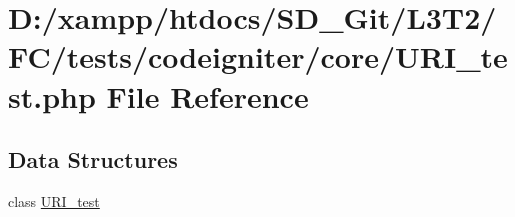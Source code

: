 \hypertarget{_u_r_i__test_8php}{}\section{D\+:/xampp/htdocs/\+S\+D\+\_\+\+Git/\+L3\+T2/\+F\+C/tests/codeigniter/core/\+U\+R\+I\+\_\+test.php File Reference}
\label{_u_r_i__test_8php}
\subsection*{Data Structures}
\begin{DoxyCompactItemize}
\item 
class \hyperlink{class_u_r_i__test}{U\+R\+I\+\_\+test}
\end{DoxyCompactItemize}
